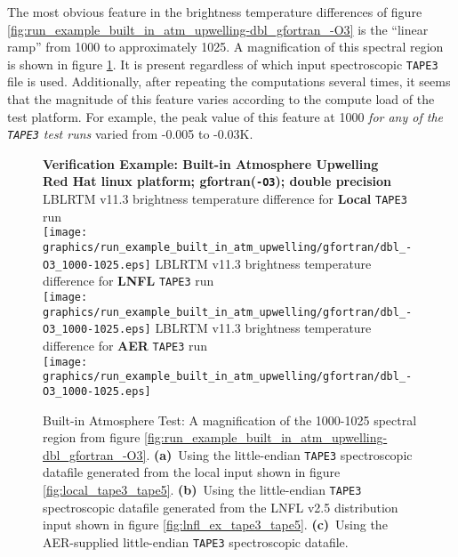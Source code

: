 The most obvious feature in the brightness temperature differences of figure \ref{fig:run_example_built_in_atm_upwelling-dbl_gfortran_-O3} is the ``linear ramp'' from 1000 to approximately 1025\invcm. A magnification of this spectral region is shown in figure \ref{fig:run_example_built_in_atm_upwelling-dbl_gfortran_-O3_1000-1025}. It is present regardless of which input spectroscopic \texttt{TAPE3} file is used. Additionally, after repeating the computations several times, it seems that the magnitude of this feature varies according to the compute load of the test platform. For example, the peak value of this feature at 1000\invcm{} \textit{for any of the \texttt{TAPE3} test runs} varied from -0.005 to -0.03K. 

\begin{figure}[htp]
  \centering
  \qquad\sffamily\textbf{Verification Example: Built-in Atmosphere Upwelling}\\
  \qquad\sffamily\textbf{Red Hat linux platform; gfortran(\texttt{-O3}); double precision}\\
  \qquad\textsf{LBLRTM v11.3 brightness temperature difference for \textbf{Local} \texttt{TAPE3} run}\\
  \texttt{[image: graphics/run\_example\_built\_in\_atm\_upwelling/gfortran/dbl\_-O3\_1000-1025.eps]}
  \qquad\textsf{LBLRTM v11.3 brightness temperature difference for \textbf{LNFL} \texttt{TAPE3} run}\\
  \texttt{[image: graphics/run\_example\_built\_in\_atm\_upwelling/gfortran/dbl\_-O3\_1000-1025.eps]}
  \qquad\textsf{LBLRTM v11.3 brightness temperature difference for \textbf{AER} \texttt{TAPE3} run}\\
  \texttt{[image: graphics/run\_example\_built\_in\_atm\_upwelling/gfortran/dbl\_-O3\_1000-1025.eps]}
  \caption{Built-in Atmosphere Test: A magnification of the 1000-1025\invcm{} spectral region from figure \ref{fig:run_example_built_in_atm_upwelling-dbl_gfortran_-O3}. \mbox{\textbf{(a)} Using} the little-endian \texttt{TAPE3} spectroscopic datafile generated from the local input shown in figure \ref{fig:local_tape3_tape5}. \mbox{\textbf{(b)} Using} the little-endian \texttt{TAPE3} spectroscopic datafile generated from the LNFL v2.5 distribution input shown in figure \ref{fig:lnfl_ex_tape3_tape5}. \mbox{\textbf{(c)} Using} the AER-supplied little-endian \texttt{TAPE3} spectroscopic datafile.}
  \label{fig:run_example_built_in_atm_upwelling-dbl_gfortran_-O3_1000-1025}
\end{figure}
